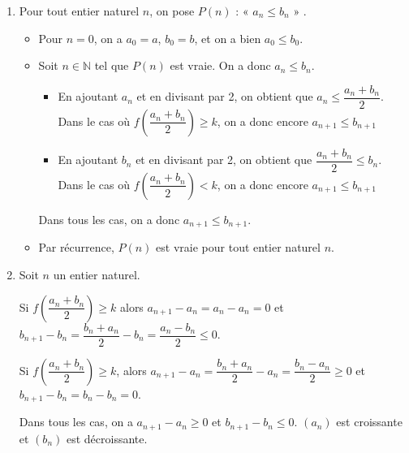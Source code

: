 \documentclass[11pt,fleqn, openany]{book} %
\begin{document}
\begin{solution}
\begin{enumerate}
\item Pour tout entier naturel $n$, on pose $P(n)$ : « $a_n \leqslant b_n$ » . 
\begin{itemize}
\item Pour $n=0$, on a $a_0=a$, $b_0=b$, et on a bien $a_0 \leqslant b_0$.
\item Soit $n\in \mathbb{N}$ tel que $P(n)$ est vraie. On a donc $a_n \leqslant b_n$.
\begin{itemize}
\item En ajoutant $a_n$ et en divisant par 2, on obtient que $a_n \leqslant \dfrac{a_n+b_n}{2}$. \\Dans le cas où $ f\left(\dfrac{a_n+b_n}{2}\right) \geqslant k$, on a donc encore $a_{n+1} \leqslant b_{n+1}$
\item En ajoutant $b_n$ et en divisant par 2, on obtient que $\dfrac{a_n+b_n}{2} \leqslant b_n$. \\Dans le cas où $ f\left(\dfrac{a_n+b_n}{2}\right) < k$, on a donc encore $a_{n+1} \leqslant b_{n+1}$
\end{itemize}
Dans tous les cas, on a donc $a_{n+1} \leqslant b_{n+1}$.
\item Par récurrence, $P(n)$ est vraie pour tout entier naturel $n$.
\end{itemize}
\item Soit $n$ un entier naturel. 

Si $ f\left(\dfrac{a_n+b_n}{2}\right) \geqslant k$ alors $a_{n+1}-a_n=a_n-a_n=0$ et  $b_{n+1}-b_n=\dfrac{b_n+a_n}{2}-b_n=\dfrac{a_n-b_n}{2} \leqslant 0$.

Si $ f\left(\dfrac{a_n+b_n}{2}\right) \geqslant k$, alors $a_{n+1}-a_n=\dfrac{b_n+a_n}{2}-a_n=\dfrac{b_n-a_n}{2} \geqslant 0$ et $b_{n+1}-b_n=b_n-b_n=0$.

Dans tous les cas, on a $a_{n+1}-a_n \geqslant 0$ et $b_{n+1}-b_n \leqslant 0$. $(a_n)$ est croissante et $(b_n)$ est décroissante.


\end{enumerate}
\end{solution}
\end{document}
